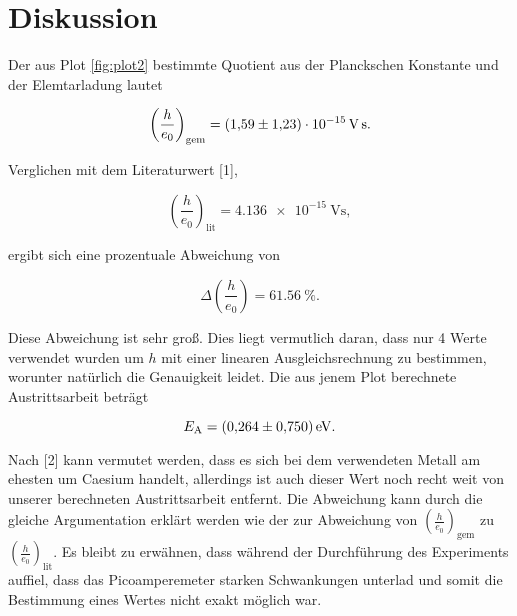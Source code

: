 \section{Diskussion}
\label{sec:Diskussion}

Der aus Plot \ref{fig:plot2} bestimmte Quotient aus der Planckschen Konstante und der Elemtarladung lautet 

\begin{equation*}
\left(\frac{h}{e_0}\right)_\text{gem} = \SI{1.59+-1.23e-15}{\volt\second}.
\end{equation*}

Verglichen mit dem Literaturwert [1],

\begin{equation*}
\left(\frac{h}{e_0}\right)_\text{lit} = \SI{4.136e-15}{\volt\second},
\end{equation*}

ergibt sich eine prozentuale Abweichung von

\begin{equation*}
\Delta\left(\frac{h}{e_0}\right) = \SI{61.56}{\percent}.
\end{equation*}

Diese Abweichung ist sehr groß. Dies liegt vermutlich daran, dass nur 4 Werte 
verwendet wurden um $h$ mit einer linearen Ausgleichsrechnung zu bestimmen, worunter
natürlich die Genauigkeit leidet. 
Die aus jenem Plot berechnete Austrittsarbeit beträgt 

\begin{equation*}
E_\text{A} = \SI{0.264+-0.750}{\eV}.
\end{equation*}

Nach [2] kann vermutet werden, dass es sich bei dem verwendeten Metall am ehesten um 
Caesium handelt, allerdings ist auch dieser Wert noch recht weit von unserer berechneten
Austrittsarbeit entfernt. Die Abweichung kann durch die gleiche Argumentation erklärt werden
wie der zur Abweichung von $\left(\frac{h}{e_0}\right)_\text{gem}$ zu $\left(\frac{h}{e_0}\right)_\text{lit}$.
Es bleibt zu erwähnen, dass während der Durchführung des Experiments auffiel, dass das Picoamperemeter
starken Schwankungen unterlad und somit die Bestimmung eines Wertes nicht exakt möglich war. 